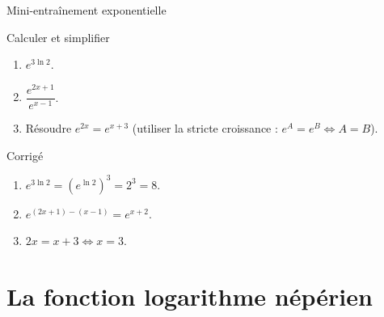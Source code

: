 \documentclass[10pt,aspectratio=169]{beamer}
\numberwithin{dummy}{section}
\begin{document}
\begin{frame}{Mini-entraînement exponentielle}
\begin{alertblock}{Calculer et simplifier}
\begin{enumerate}
    \item $e^{3\ln 2}$.
    \item $\dfrac{e^{2x+1}}{e^{x-1}}$.
    \item Résoudre $e^{2x}=e^{x+3}$ (utiliser la stricte croissance : $e^A=e^B\iff A=B$).
\end{enumerate}
\end{alertblock}

\pause
\begin{block}{Corrigé}
\begin{enumerate}
    \item $e^{3\ln 2}=(e^{\ln 2})^3=2^3=8$.
    \item $e^{(2x+1)-(x-1)}=e^{x+2}$.
    \item $2x=x+3 \iff x=3$.
\end{enumerate}
\end{block}
\end{frame}

\section{La fonction logarithme népérien}
\end{document}
